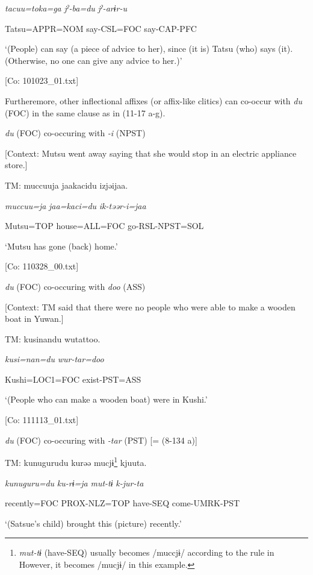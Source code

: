       \textit{tacuu=toka=ga}  \textit{jˀ-ba=du}  \textit{jˀ-arɨr-u}

      Tatsu=APPR=NOM  say-CSL=FOC  say-CAP-PFC

      ‘(People) can say (a piece of advice to her), since (it is) Tatsu (who) says (it). (Otherwise, no one can give any advice to her.)’

      [Co: 101023\_01.txt]
\z
\z

  Furtheremore, other inflectional affixes (or affix-like clitics) can co-occur with \textit{du} (FOC) in the same clause as in (11-17 a-g).

\ea\label{ex:11-17}  \ea \textit{du} (FOC) co-occuring with \textit{{}-i} (NPST)

  [Context: Mutsu went away saying that she would stop in an electric appliance store.]

  TM:  muccuuja  jaakacidu  izjəijaa.

    \textit{muccuu=ja}  \textit{jaa=kaci=du}  \textit{ik-təər-i=jaa}

    Mutsu=TOP  house=ALL=FOC  go-RSL-NPST=SOL

    ‘Mutsu has gone (back) home.’

    [Co: 110328\_00.txt]

  \ex \textit{du} (FOC) co-occuring with \textit{doo} (ASS)

  [Context: TM said that there were no people who were able to make a wooden boat in Yuwan.]

  TM:  kusinandu  wutattoo.

    \textit{kusi=nan=du}  \textit{wur-tar=doo}

    Kushi=LOC1=FOC  exist-PST=ASS

    ‘(People who can make a wooden boat) were in Kushi.’

    [Co: 111113\_01.txt]

  \ex \textit{du} (FOC) co-occuring with \textit{{}-tar} (PST) [= (8-134 a)]

  TM:  kunugurudu  kurəə  mucjɨ\footnote{\textit{mut-tɨ} (have-SEQ) usually becomes /muccjɨ/ according to the rule in  However, it becomes /mucjɨ/ in this example.}  kjuuta.

    \textit{kunuguru=du}  \textit{ku-rɨ=ja}  \textit{mut-tɨ}  \textit{k-jur-ta}

    recently=FOC  PROX-NLZ=TOP  have-SEQ  come-UMRK-PST

    ‘(Satsue’s child) brought this (picture) recently.’

